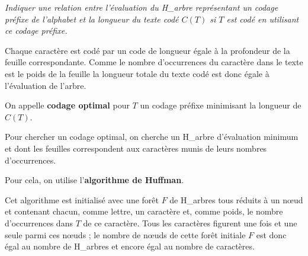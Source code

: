 \begin{Exercise}\it
Indiquer une relation entre l’évaluation du H\_arbre représentant un codage préfixe de l’alphabet
et la longueur du texte codé $C(T)$ si $T$ est codé en utilisant ce codage préfixe.
\end{Exercise}
\begin{Answer}

Chaque caractère est codé par un code de longueur égale à la profondeur de la feuille
correspondante. Comme le nombre d’occurrences du caractère dans le texte est le poids de la feuille la longueur totale du texte codé est donc égale à l'évaluation de l’arbre.
\end{Answer}
\medskip
On appelle {\bf codage optimal} pour $T$ un codage préfixe minimisant la longueur de $C(T)$. 

Pour chercher un codage optimal, on cherche un H\_arbre d’évaluation minimum et dont les feuilles correspondent aux
caractères munis de leurs nombres d’occurrences. 

Pour cela, on utilise l'{\bf algorithme de Huffman}. 

Cet algorithme est initialisé avec une forêt $F$ de H\_arbres tous réduits à un nœud et contenant chacun,
comme lettre, un caractère et, comme poids, le nombre d’occurrences dans $T$ de ce caractère.
Tous les caractères figurent une fois et une seule parmi ces nœuds ; le nombre de nœuds de cette forêt initiale $F$ est donc égal au nombre de H\_arbres et encore égal au nombre de caractères. 

